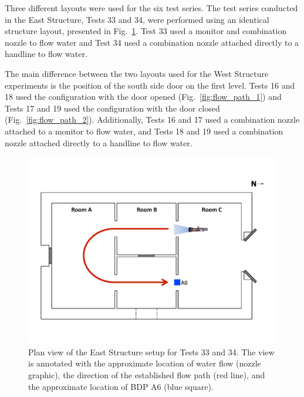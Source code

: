 \documentclass[12pt,oneside]{book}
\begin{document}
Three different layouts were used for the six test series. The test series conducted in the East Structure, Tests 33 and 34, were performed using an identical structure layout, presented in Fig.~\ref{fig:east_setup}. Test 33 used a monitor and combination nozzle to flow water and Test 34 used a combination nozzle attached directly to a handline to flow water.

The main difference between the two layouts used for the West Structure experiments is the position of the south side door on the first level. Tests 16 and 18 used the configuration with the door opened (Fig.~\ref{fig:flow_path_1}) and Tests 17 and 19 used the configuration with the door closed (Fig.~\ref{fig:flow_path_2}). Additionally, Tests 16 and 17 used a combination nozzle attached to a monitor to flow water, and Tests 18 and 19 used a combination nozzle attached directly to a handline to flow water.

\begin{figure}[!ht]
\includegraphics[width=6in]{../Drawings/Specific_Tests/East_Hose_Test_Annotated}
\caption[Plan view of the East Structure setup for Tests 33 and 34.]{Plan view of the East Structure setup for Tests 33 and 34. The view is annotated with the approximate location of water flow (nozzle graphic), the direction of the established flow path (red line), and the approximate location of BDP A6 (blue square).}
\label{fig:east_setup}
\end{figure}
\end{document}
